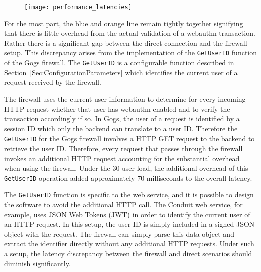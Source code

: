 \begin{figure}[h]
  \centering
  \texttt{[image: performance\_latencies]}
\end{figure}

For the most part, the blue and orange line remain tightly together signifying that there is little overhead from the actual validation of a webauthn transaction. Rather there is a significant gap between the direct connection and the firewall setup. This discrepancy arises from the implementation of the \lstinline{GetUserID} function of the Gogs firewall. The \lstinline{GetUserID} is a configurable function described in Section~\ref{Sec:ConfigurationParameters} which identifies the current user of a request received by the firewall. 

The firewall uses the current user information to determine for every incoming HTTP request whether that user has webauthn enabled and to verify the transaction accordingly if so. In Gogs, the user of a request is identified by a session ID which only the backend can translate to a user ID. Therefore the \lstinline{GetUserID} for the Gogs firewall involves a HTTP GET request to the backend to retrieve the user ID. Therefore, every request that passes through the firewall invokes an additional HTTP request accounting for the substantial overhead when using the firewall. Under the 30 user load, the additional overhead of this \lstinline{GetUserID} operation added approximately 70 milliseconds to the overall latency.

The \lstinline{GetUserID} function is specific to the web service, and it is possible to design the software to avoid the additional HTTP call. The Conduit web service, for example, uses JSON Web Tokens (JWT) in order to identify the current user of an HTTP request. In this setup, the user ID is simply included in a signed JSON object with the request. The firewall can simply parse this data object and extract the identifier directly without any additional HTTP requests. Under such a setup, the latency discrepancy between the firewall and direct scenarios should diminish significantly.




